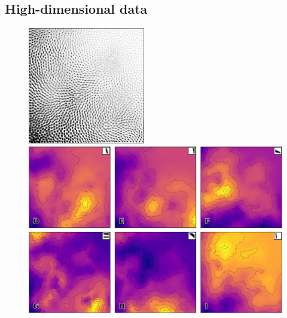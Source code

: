 \subsection{High-dimensional data}






\begin{figure}
  \setlength{\fboxsep}{0pt}%
  \setlength{\fboxrule}{.25pt}%

        \includegraphics[height=5.1cm]{figures/vsom-image.pdf}

  
  \vspace{2mm}

  \includegraphics[width=\textwidth]{figures/vsom-image-2.pdf}


\end{figure}
